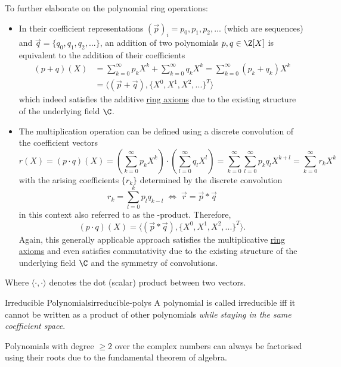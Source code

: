 To further elaborate on the polynomial ring operations:
\begin{itemize}
  \item In their coefficient representations $(\vec{p})_i = p_0, p_1, p_2, ...$ (which are sequences) and $\vec{q} = \{q_0, q_1, q_2, ...\}$,
        an addition of two polynomials $p, q \in \Z[X]$ is equivalent to the addition of their coefficients
        \begin{align*}
          (p + q)(X) & = \sum_{k=0}^\infty p_k X^k + \sum_{k=0}^\infty q_k X^k = \sum_{k=0}^\infty (p_k + q_k) X^k \\
                     & = \langle (\vec{p} + \vec{q}), \{X^0, X^1, X^2, ...\}^T \rangle
        \end{align*}
        which indeed satisfies the additive \hyperref[def:ring]{ring axioms}
        due to the existing structure of the underlying field $\C$.
  \item The multiplication operation can be defined using a discrete convolution of the coefficient vectors
        $$r(X) = (p \cdot q)(X) = (\sum_{k=0}^\infty p_k X^k) \cdot (\sum_{l=0}^\infty q_l X^l)
          = \sum_{k=0}^\infty \sum_{l=0}^\infty p_k q_l X^{k+l}
          = \sum_{k=0}^\infty r_k X^k$$
        with the arising coefficients $\{r_k\}$ determined by the discrete convolution
        $$r_k = \sum_{l=0}^k p_l q_{k-l} \;\Leftrightarrow\; \vec{r} = \vec{p} * \vec{q}$$
        in this context also referred to as the -product. Therefore,
        $$(p \cdot q)(X) = \langle (\vec{p} * \vec{q}), \{X^0, X^1, X^2, ...\}^T \rangle.$$
        Again, this generally applicable approach satisfies the multiplicative \hyperref[def:ring]{ring axioms}
        and even satisfies commutativity due to the existing structure of the underlying field $\C$
        and the symmetry of convolutions.
\end{itemize}

Where $\langle \cdot, \cdot \rangle$ denotes the dot (scalar) product between two vectors.

\begin{definition}{Irreducible Polynomials}{irreducible-polys}
  A polynomial is called irreducible iff it cannot be written as a product of other polynomials
  \textsl{while staying in the same coefficient space}.
\end{definition}

Polynomials with degree $\geq 2$ over the complex numbers can always be factorised using their roots
due to the fundamental theorem of algebra.


